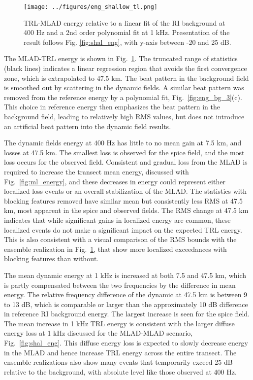 \documentclass[preprint,NumberedRefs]{JASA}
\begin{document}
\begin{figure}
\texttt{[image: ../figures/eng\_shallow\_tl.png]}
        \caption{TRL-MLAD energy relative to a linear fit of the RI background at 400 Hz and a 2nd order polynomial fit at 1 kHz. Presentation of the result follows Fig. \ref{fig:shal_eng}, with y-axis between -20 and 25 dB.}
    \label{fig:eng_tl}
\end{figure}
The MLAD-TRL energy is shown in Fig.~\ref{fig:eng_tl}. The truncated range of statistics (black lines) indicates a linear regression region that avoids the first convergence zone, which is extrapolated to 47.5 km. The beat pattern in the background field is smoothed out by scattering in the dynamic fields. A similar beat pattern was removed from the reference energy by a polynomial fit, Fig.~\ref{fig:eng_bg_3}(c). This choice in reference energy then emphasizes the beat pattern in the background field, leading to relatively high RMS values, but does not introduce an artificial beat pattern into the dynamic field results.

The dynamic fields energy at 400 Hz has little to no mean gain at 7.5 km, and losses at 47.5 km. The smallest loss is observed for the spice field, and the most loss occurs for the observed field. Consistent and gradual loss from the MLAD is required to increase the transect mean energy, discussed with Fig.~\ref{fig:ml_energy}, and these decreases in energy could represent either localized loss events or an overall stabilization of the MLAD. The statistics with blocking features removed have similar mean but consistently less RMS at 47.5 km, most apparent in the spice and observed fields. The RMS change at 47.5 km indicates that while significant gains in localized energy are common, these localized events do not make a significant impact on the expected TRL energy. This is also consistent with a visual comparison of the RMS bounds with the ensemble realization in Fig.~\ref{fig:eng_tl}, that show more localized exceedances with blocking features than without.

The mean dynamic energy at 1 kHz is increased at both 7.5 and 47.5 km, which is partly compensated between the two frequencies by the difference in mean energy. The relative frequency difference of the dynamic at 47.5 km is between 9 to 13 dB, which is comparable or larger than the approximately 10 dB difference in reference RI background energy. The largest increase is seen for the spice field. The mean increase in 1 kHz TRL energy is consistent with the larger diffuse energy loss at 1 kHz discussed for the MLAD-MLAD scenario, Fig.~\ref{fig:shal_eng}. This diffuse energy loss is expected to slowly decrease energy in the MLAD and hence increase TRL energy across the entire transect. The ensemble realizations also show many events that temporarily exceed 25 dB relative to the background, with absolute level like those observed at 400 Hz.
\end{document}
